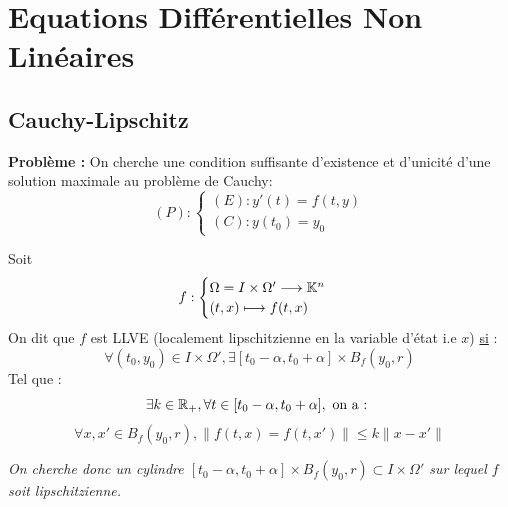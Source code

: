 \chapter{Equations Différentielles Non Linéaires}


\setlength{\parindent}{0pt}
\renewcommand{\labelitemi}{\textbullet} %


\section{Cauchy-Lipschitz}

\textbf{Problème : } On cherche une condition suffisante d'existence et d'unicité d'une solution maximale au problème 
de Cauchy: 
    \[ (P) : 
        \begin{cases}
            (E) : y'(t) = f(t,y) \\ 
            (C) : y(t_0) = y_0 
        \end{cases}
    \] 

\begin{definition}
    Soit 
        \[ f : 
            \begin{cases}
                \Omega = I \times \Omega' \longrightarrow \mathbb{K}^n \\ 
                (t,x) \longmapsto f(t,x)
            \end{cases} \] 
    On dit que $f$ est LLVE (localement lipschitzienne en la variable d'état i.e $x$) \underline{si} :
        \[ \forall (t_0, y_0) \in I \times \Omega', \exists [t_0 - \alpha, t_0 + \alpha] \times B_f(y_0,r) \] 
    Tel que : 
        \[ \exists k \in \mathbb{R}_+, \forall t \in [t_0 - \alpha, t_0 + \alpha], \text{ on a : } \] 
        \[ \boxed{ \forall x,x' \in B_f(y_0,r), \| f(t,x) = f(t,x') \| \leqslant k \| x - x'\| } \] 
    
    \emph{On cherche donc un cylindre $[t_0 - \alpha, t_0 + \alpha] \times B_f(y_0,r) \subset I \times \Omega'$ sur lequel 
    $f$ soit lipschitzienne.}
\end{definition}

